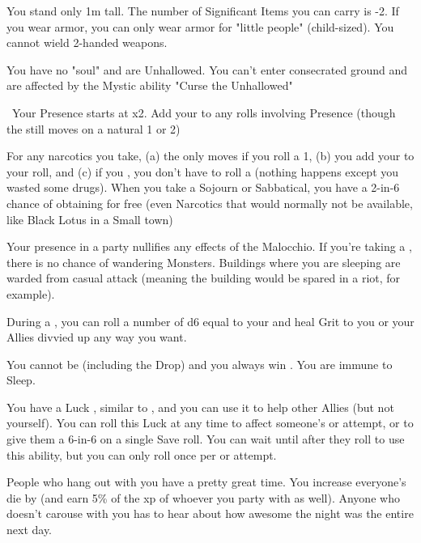 {  
  You stand only 1m tall.  The number of Significant Items you can carry is -2. If you wear armor, you can only wear armor for "little people" (child-sized).  You cannot wield 2-handed weapons.

  You have no "soul" and are Unhallowed. You can't enter consecrated ground and are affected by the Mystic ability "Curse the Unhallowed"

  \
  Your Presence starts at \DCUP x2.  Add your \LVL to any rolls involving Presence (though the \UD still moves \DCDOWN on a natural 1 or 2)



  For any narcotics you take, (a) the \UD only moves \DCDOWN if you roll a 1, (b) you add your \LVL to your  roll, and (c) if you , you don't have to roll a  (nothing happens except you wasted some drugs).  When you take a Sojourn or Sabbatical, you have a 2-in-6 chance of obtaining   for free (even Narcotics that would normally not be available, like Black Lotus in a Small town)

  Your presence in a party nullifies any effects of the Malocchio.  If you're taking a , there is no chance of wandering Monsters. Buildings where you are sleeping are warded from casual attack (meaning the building would be spared in a riot, for example). 

  During a , you can roll a number of d6 equal to your \LVL and heal \SUM Grit to you or your Allies divvied up any way you want.  

  You cannot be  (including the Drop) and you always win .  You are immune to Sleep.

  You have a Luck \UD, similar to , and you can use it to help other Allies (but not yourself).  You can roll this Luck \UD at any time to affect someone's \RO or \RB attempt, or to give them a 6-in-6 on a single Save roll.  You can wait until after they roll to use this ability, but you can only roll once per \RO or \RB attempt.

  People who hang out with you have a pretty great time.  You increase everyone's  die by \DCUP (and earn 5\% of the xp of whoever you party with as well). Anyone who doesn't carouse with you has to hear about how awesome the night was the entire next day.

}
